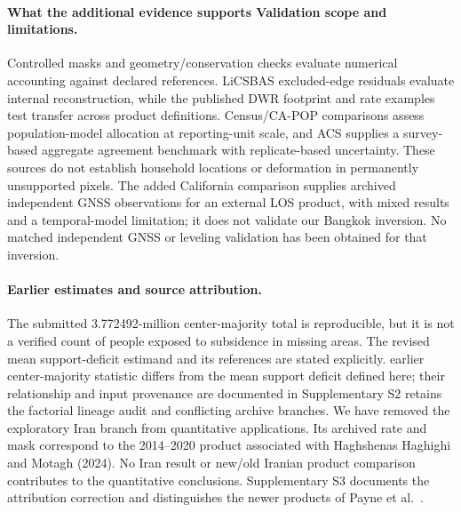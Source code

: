 \documentclass[pdflatex,sn-nature]{sn-jnl}
\providecommand{\DIFadd}[1]{{\protect\color{blue} \sf #1}} %
\providecommand{\DIFdel}[1]{{\protect\color{red} \scriptsize #1}} %
\providecommand{\DIFaddbegin}{} %
\providecommand{\DIFaddend}{} %
\providecommand{\DIFdelbegin}{} %
\providecommand{\DIFdelend}{} %
\begin{document}
\paragraph{\DIFdelbegin \DIFdel{What the additional evidence supports}\DIFdelend \DIFaddbegin \DIFadd{Validation scope and limitations}\DIFaddend .} Controlled masks and geometry/conservation checks evaluate numerical accounting against declared references. LiCSBAS excluded-edge residuals evaluate internal reconstruction, while the published DWR footprint and rate examples test transfer across product definitions. Census/CA-POP comparisons assess population-model allocation at reporting-unit scale, and ACS supplies a survey-based aggregate agreement benchmark with replicate-based uncertainty. These sources do not establish household locations or deformation in permanently unsupported pixels. The added California comparison supplies archived independent GNSS observations for an external LOS product, with mixed results and a temporal-model limitation; it does not validate our Bangkok inversion. No matched independent GNSS or leveling validation has been obtained for that inversion.



\paragraph{Earlier estimates and source attribution.} The submitted 3.772492-million center-majority total is reproducible, but it is not a verified count of people exposed to subsidence in missing areas. The \DIFdelbegin \DIFdel{revised mean support-deficit estimand and its references are stated explicitly. }\DIFdelend \DIFaddbegin \DIFadd{earlier center-majority statistic differs from the mean support deficit defined here; their relationship and input provenance are documented in }\DIFaddend Supplementary S2\DIFdelbegin \DIFdel{retains the factorial lineage audit and conflicting archive branches}\DIFdelend . We have removed the exploratory Iran branch from quantitative applications. Its archived rate and mask correspond to the 2014--2020 product associated with Haghshenas Haghighi and Motagh (2024). No Iran result or new/old Iranian product comparison contributes to the quantitative conclusions. Supplementary S3 documents the attribution correction and distinguishes the newer products of Payne et al.\ \citep{haghshenas2024iran,payne2025iran,payne2024data}.
\end{document}
